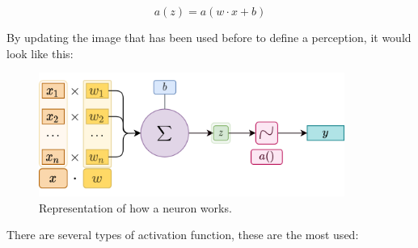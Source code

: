\begin{equation}
    a(z) = a(w \cdot x + b)
    \label{eqn:activationfunctionbasic}
\end{equation}

By updating the image that has been used before to define a perception, it would look like this:
\begin{figure}[H]
    \centering
    \includegraphics[width=10cm]{images/state-of-art/activation-functions/activation_representation.png}
    \caption{Representation of how a neuron works.}
    \label{fig:basicneuron}
\end{figure}

There are several types of activation function, these are the most used:

